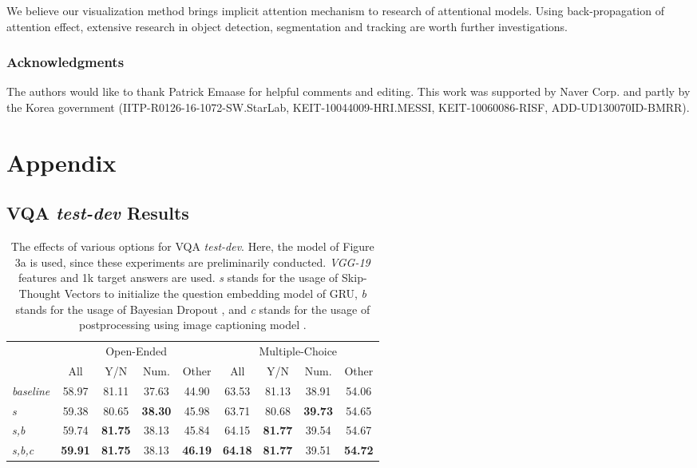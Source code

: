 \documentclass{article}
\begin{document}
We believe our visualization method brings implicit attention mechanism to research of attentional models. Using back-propagation of attention effect, extensive research in object detection, segmentation and tracking are worth further investigations.

\subsubsection*{Acknowledgments}

The authors would like to thank Patrick Emaase for helpful comments and editing. This work was supported by Naver Corp. and partly by the Korea government (IITP-R0126-16-1072-SW.StarLab, KEIT-10044009-HRI.MESSI, KEIT-10060086-RISF, ADD-UD130070ID-BMRR).




\setcounter{section}{0}
\renewcommand\theHsection{\Alph{section}}
\renewcommand\thesection{\Alph{section}}
\renewcommand\thesubsection{\thesection.\arabic{subsection}}

\clearpage{}\section{Appendix}

\subsection{VQA \textit{test-dev} Results}

\begin{table}[h]
\caption{The effects of various options for VQA \textit{test-dev}. Here, the model of Figure 3a is used, since these experiments are preliminarily conducted. \textit{VGG-19} features and 1k target answers are used. \textit{s} stands for the usage of Skip-Thought Vectors \cite{Kiros2015} to initialize the question embedding model of GRU, \textit{b} stands for the usage of Bayesian Dropout \cite{Gal2015}, and \textit{c} stands for the usage of postprocessing using image captioning model \cite{Karpathy}.}
\label{tab:options}
\centering
\begin{tabular}{lcccccccc}
\toprule
& \multicolumn{4}{c}{Open-Ended} & \multicolumn{4}{c}{Multiple-Choice}\\
\cmidrule{2-5}
\cmidrule{6-9}
 & All & Y/N & Num. & Other & All & Y/N & Num. & Other\\
\midrule
  \textit{baseline} & 
     58.97 & 81.11 & 37.63 & 44.90 & 63.53 & 81.13 & 38.91 & 54.06 \\
  \textit{s} & 
     59.38 & 80.65 & \textbf{38.30} & 45.98 & 63.71 & 80.68 & \textbf{39.73} & 54.65 \\
  \textit{s,b} & 
     59.74 & \textbf{81.75} & 38.13 & 45.84 & 64.15 & \textbf{81.77} & 39.54 & 54.67 \\
  \textit{s,b,c} & 
     \textbf{59.91} & \textbf{81.75} & 38.13 & \textbf{46.19} & \textbf{64.18} & \textbf{81.77} & 39.51 & \textbf{54.72} \\
\bottomrule
\end{tabular}
\end{table}
\end{document}

